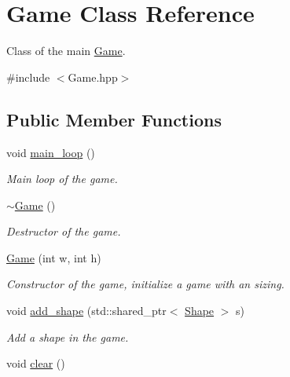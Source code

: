\hypertarget{classGame}{}\section{Game Class Reference}
\label{classGame}


Class of the main \hyperlink{classGame}{Game}.  




{\ttfamily \#include $<$Game.\+hpp$>$}

\subsection*{Public Member Functions}
\begin{DoxyCompactItemize}
\item 
\mbox{\label{classGame_a9e9a77d478f0c0bfb9b61fb1a6556e15}} 
void \hyperlink{classGame_a9e9a77d478f0c0bfb9b61fb1a6556e15}{main\+\_\+loop} ()
\begin{DoxyCompactList}\small\item\em Main loop of the game. \end{DoxyCompactList}\item 
\mbox{\label{classGame_ae3d112ca6e0e55150d2fdbc704474530}} 
\hyperlink{classGame_ae3d112ca6e0e55150d2fdbc704474530}{$\sim$\+Game} ()
\begin{DoxyCompactList}\small\item\em Destructor of the game. \end{DoxyCompactList}\item 
\hyperlink{classGame_a2b0cb8af7b823a6d595eef9c9641f806}{Game} (int w, int h)
\begin{DoxyCompactList}\small\item\em Constructor of the game, initialize a game with an sizing. \end{DoxyCompactList}\item 
void \hyperlink{classGame_aab43fea0e202c203d998ae575d3f6eeb}{add\+\_\+shape} (std\+::shared\+\_\+ptr$<$ \hyperlink{classShape}{Shape} $>$ s)
\begin{DoxyCompactList}\small\item\em Add a shape in the game. \end{DoxyCompactList}\item 
\mbox{\label{classGame_a8ba8d7bcda356ed584dc445184320ff7}} 
void \hyperlink{classGame_a8ba8d7bcda356ed584dc445184320ff7}{clear} ()

\end{DoxyCompactItemize}
